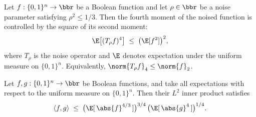 \begin{theorem}
Let $f:\{0,1\}^n\to\bbr$ be a Boolean function and let $\rho\in\bbr$ be a noise
parameter satisfying $\rho^2\le 1/3$. Then the fourth moment of the noised function is
controlled by the square of its second moment:
\[
  \E\bigl[(T_\rho f)^4\bigr]\;\le\;\bigl(\E[f^2]\bigr)^2,
\]
where $T_\rho$ is the noise operator and $\E$ denotes expectation under the uniform
measure on $\{0,1\}^n$. Equivalently, $\norm{T_\rho f}_4\le\norm{f}_2$.
\end{theorem}

\begin{lemma}
\label{BooleanAnalysis.Hypercontractivity.innerProduct_le_L43_L4}
\leanok
{}
Let $f, g : \{0,1\}^n \to \bbr$ be Boolean functions, and take all expectations with
respect to the uniform measure on $\{0,1\}^n$. Then their $L^2$ inner product satisfies
\[
  \langle f, g \rangle
  \;\le\;
  \bigl(\E[\,\abs{f}^{4/3}\,]\bigr)^{3/4}\,
  \bigl(\E[\,\abs{g}^{4}\,]\bigr)^{1/4}.
\]
\end{lemma}

